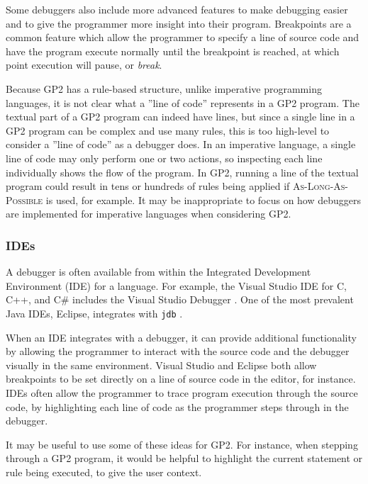\documentclass[authoryearcitations]{UoYCSproject}
\begin{document}
Some debuggers also include more advanced features to make debugging easier and to
give the programmer more insight into their program. Breakpoints are a common feature
which allow the programmer to specify a line of source code and have the program
execute normally until the breakpoint is reached, at which point execution will
pause, or \emph{break}.

Because GP2 has a rule-based structure, unlike imperative programming languages,
it is not clear what a ''line of code'' represents in a GP2 program. The textual
part of a GP2 program can indeed have lines, but since a single line in a GP2
program can be complex and use many rules, this is too high-level to consider a
''line of code'' as a debugger does. In an imperative language, a single line of
code may only perform one or two actions, so inspecting each line individually
shows the flow of the program. In GP2, running a line of the textual program
could result in tens or hundreds of rules being applied if \textsc{As-Long-As-Possible}
is used, for example. It may be inappropriate to focus on how debuggers are
implemented for imperative languages when considering GP2.


\subsubsection{IDEs}
\label{sec:IDEs}

A debugger is often available from within the Integrated Development Environment
(IDE) for a language. For example, the Visual Studio IDE for C, C++, and C\#
includes the Visual Studio Debugger \citep{msdnsite}. One of the most prevalent
Java IDEs, Eclipse, integrates with \texttt{jdb} \citep{eclipsesite}.

When an IDE integrates with a debugger, it can provide additional functionality
by allowing the programmer to interact with the source code and the debugger
visually in the same environment. Visual Studio and Eclipse both allow breakpoints
to be set directly on a line of source code in the editor, for instance. IDEs
often allow the programmer to trace program execution through the source code,
by highlighting each line of code as the programmer steps through in the debugger.

It may be useful to use some of these ideas for GP2. For instance, when stepping
through a GP2 program, it would be helpful to highlight the current statement or
rule being executed, to give the user context.
\end{document}
